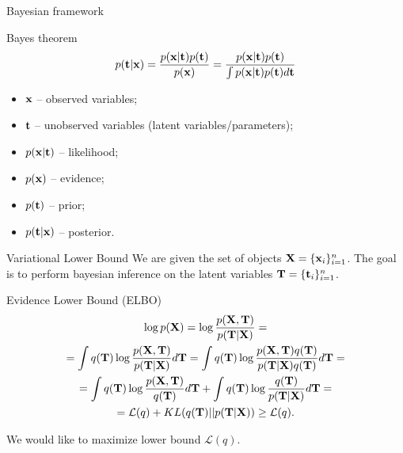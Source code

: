 \begin{frame}{Bayesian framework}
    \begin{block}{Bayes theorem}
    \[
        p(\mathbf{t} | \mathbf{x}) = \frac{p(\mathbf{x} | \mathbf{t}) p(\mathbf{t})}{p(\mathbf{x})} = \frac{p(\mathbf{x} | \mathbf{t}) p(\mathbf{t})}{\int p(\mathbf{x} | \mathbf{t}) p(\mathbf{t}) d \mathbf{t}} 
    \]
    \begin{itemize}
        \item $\mathbf{x}$ -- observed variables;
        \item $\mathbf{t}$ -- unobserved variables (latent variables/parameters);
        \item $p(\mathbf{x} | \mathbf{t})$ -- likelihood;
        \item $p(\mathbf{x})$ -- evidence;
        \item $p(\mathbf{t})$ -- prior;
        \item $p(\mathbf{t} | \mathbf{x})$ -- posterior.
    \end{itemize}
    \end{block}
\end{frame}
\begin{frame}{Variational Lower Bound}
    We are given the set of objects $\mathbf{X} = \{\mathbf{x}_i\}_{i=1}^n$. 
    The goal is to perform bayesian inference on the latent variables $\mathbf{T} = \{\mathbf{t}_i\}_{i=1}^n$.
    \begin{block}{Evidence Lower Bound (ELBO)}
    \vspace{-0.3cm}
        \begin{multline*}
    		\log p(\mathbf{X}) 
    		= \log \frac{p(\mathbf{X}, \mathbf{T})}{p(\mathbf{T}|\mathbf{X})} = \\ 
    		= \int q(\mathbf{T}) \log \frac{p(\mathbf{X}, \mathbf{T})}{p(\mathbf{T}|\mathbf{X})}d\mathbf{T}
    		= \int q(\mathbf{T}) \log \frac{p(\mathbf{X}, \mathbf{T}) q(\mathbf{T})}{p(\mathbf{T}|\mathbf{X}) q(\mathbf{T})} d\mathbf{T} = \\
    		= \int q(\mathbf{T}) \log \frac{p(\mathbf{X}, \mathbf{T})}{q(\mathbf{T})}d\mathbf{T} + \int q(\mathbf{T}) \log \frac{q(\mathbf{T})}{p(\mathbf{T}|\mathbf{X})}d\mathbf{T} = \\ 
    		= \mathcal{L} (q) + KL(q(\mathbf{T}) || p(\mathbf{T}|\mathbf{X})) \geq \mathcal{L} (q).
    	\end{multline*}
        \vspace{-0.3cm}
    \end{block}
	We would like to maximize lower bound $\mathcal{L}(q)$.
\end{frame}

